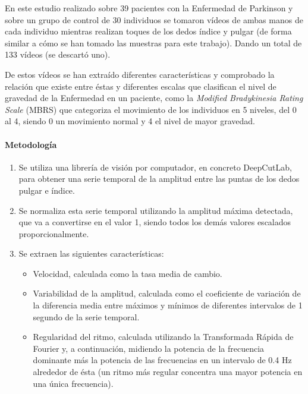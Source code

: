 En este estudio \cite{williams2020discerning} realizado sobre 39 pacientes con
la Enfermedad de Parkinson y sobre un grupo de control de 30 individuos se
tomaron vídeos de ambas manos de cada individuo mientras realizan toques de los
dedos índice y pulgar (de forma similar a cómo se han tomado las muestras para
este trabajo). Dando un total de 133 vídeos (se descartó uno).

De estos vídeos se han extraído diferentes características y comprobado la
relación que existe entre éstas y diferentes escalas que clasifican el nivel de
gravedad de la Enfermedad en un paciente, como la \textit{Modified Bradykinesia
    Rating Scale} (MBRS) que categoriza el movimiento de los individuos en 5
niveles, del 0 al 4, siendo 0 un movimiento normal y 4 el nivel de mayor
gravedad.


\paragraph{Metodología}

\begin{enumerate}
    \item Se utiliza una librería de visión por computador, en concreto
          DeepCutLab, para obtener una serie temporal de la amplitud entre las
          puntas de los dedos pulgar e índice.
    \item Se normaliza esta serie temporal utilizando la amplitud máxima
          detectada, que va a convertirse en el valor 1, siendo todos los demás
          valores escalados proporcionalmente.
    \item Se extraen las siguientes características:
          \begin{itemize}
              \item Velocidad, calculada como la tasa media de cambio.
              \item Variabilidad de la amplitud, calculada como el coeficiente
                    de variación de la diferencia media entre máximos y mínimos
                    de diferentes intervalos de 1 segundo de la serie temporal.
              \item Regularidad del ritmo, calculada utilizando la Transformada
                    Rápida de Fourier y, a continuación, midiendo la potencia de
                    la frecuencia dominante más la potencia de las frecuencias
                    en un intervalo de 0.4 Hz alrededor de ésta (un ritmo más
                    regular concentra una mayor potencia en una única
                    frecuencia).
          \end{itemize}
\end{enumerate}


